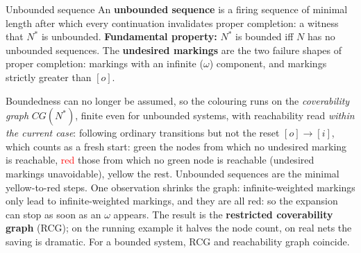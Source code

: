 \begin{definitionbox}{Unbounded sequence}
An \textbf{unbounded sequence} is a firing sequence of minimal length after which every continuation invalidates proper completion: a witness that $N^{*}$ is unbounded. \textbf{Fundamental property:} $N^{*}$ is bounded iff $N$ has no unbounded sequences. The \textbf{undesired markings} are the two failure shapes of proper completion: markings with an infinite ($\omega$) component, and markings strictly greater than $[o]$.
\end{definitionbox}
Boundedness can no longer be assumed, so the colouring runs on the \emph{coverability graph} $\mathit{CG}(N^{*})$, finite even for unbounded systems, with reachability read \emph{within the current case}: following ordinary transitions but not the reset $[o]\to[i]$, which counts as a fresh start: \textcolor{green!50!black}{green} the nodes from which no undesired marking is reachable, \textcolor{red}{red} those from which no green node is reachable (undesired markings unavoidable), yellow the rest. Unbounded sequences are the minimal yellow-to-red steps. One observation shrinks the graph: infinite-weighted markings only lead to infinite-weighted markings, and they are all red: so the expansion can stop as soon as an $\omega$ appears. The result is the \textbf{restricted coverability graph} (RCG); on the running example it halves the node count, on real nets the saving is dramatic. For a bounded system, RCG and reachability graph coincide.
